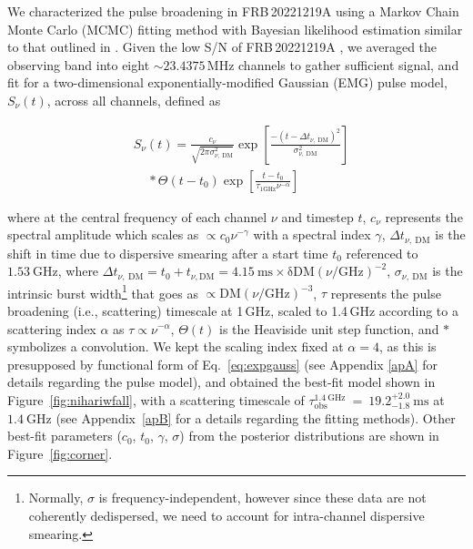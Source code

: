 \documentclass[twocolumn, linenumbers, tra]{aastex631}
\newcommand{\rev}[1]{{\color{purple}#1}}
\newcommand{\nihari}{FRB\,20221219A } %
\begin{document}
\rev{
We characterized the pulse broadening in \nihari using a Markov Chain Monte Carlo (MCMC) fitting method with Bayesian likelihood estimation similar to that outlined in \cite{Ravi2019}. Given the low S/N of \nihari, we averaged the observing band into eight $ \sim 23.4375$\,MHz channels to gather sufficient signal, and fit for a two-dimensional exponentially-modified Gaussian (EMG) pulse model, $S_{\nu}(t)$, across all channels, defined as 

\begin{equation}\label{eq:expgauss}
\begin{aligned}
& S_{\nu}(t)=\frac{c_{\nu}}{\sqrt{2 \pi \sigma_{\nu,\ \mathrm{DM}}^2}} \exp \left[\frac{-\left(t-\Delta t_{\nu,\ \mathrm{DM}} \right)^2}{\sigma_{\nu,\ \mathrm{DM}}^2}\right] \\
&~~~~~ \ast \Theta\left(t-t_0\right) \exp \left[\frac{t-t_0}{\tau_{1\mathrm{GHz}} \nu^{-\alpha}}\right]
\end{aligned}
\end{equation}

\noindent
where at the central frequency of each channel $\nu$ and timestep $t$, $c_{\nu}$ represents the spectral amplitude which scales as $\propto c_0\nu^{-\gamma}$ with a spectral index $\gamma$, $\Delta t_{\nu,\ \mathrm{DM}}$ is the shift in time due to dispersive smearing after a start time $t_0$ referenced to $1.53\ \mathrm{GHz}$, where $\Delta t_{\nu,\ \mathrm{DM}} = t_0 + t_{\nu, \mathrm{DM}}=4.15 \mathrm{~ms} \times \mathrm{\delta DM}\left(\nu / \mathrm{GHz}\right)^{-2}$, $\sigma_{\nu,\ \mathrm{DM}}$ is the intrinsic burst width\footnote{\rev{Normally, $\sigma$ is frequency-independent, however since these data are not coherently dedispersed, we need to account for intra-channel dispersive smearing.}} that goes as $\propto \mathrm{DM}\left(\nu / \mathrm{GHz}\right)^{-3}$, $\tau$ represents the pulse broadening (i.e., scattering) timescale at 1\,GHz, scaled to 1.4\,GHz according to a scattering index $\alpha$ as $\tau \propto \nu^{-\alpha}$, $\Theta(t)$ is the Heaviside unit step function, and $\ast$ symbolizes a convolution. We kept the scaling index fixed at $\alpha = 4$, as this is presupposed by functional form of Eq.~\ref{eq:expgauss} (see Appendix \ref{apA} for details regarding the pulse model), and obtained the best-fit model shown in Figure\ \ref{fig:nihariwfall}, with a scattering timescale of $\tau^{\mathrm{1.4\ GHz}}_{\mathrm{obs}}\ =\ 19.2_{-1.8}^{+2.0}\ \mathrm{ms}$ at $1.4\ \mathrm{GHz}$ (see Appendix\ \ref{apB} for a details regarding the fitting methods). Other best-fit parameters ($c_0$, $t_0$, $\gamma$, $\sigma$) from the posterior distributions are shown in Figure\ \ref{fig:corner}.}
\end{document}
